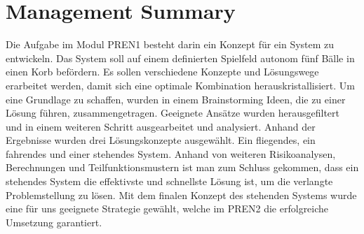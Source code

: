 \section*{Management Summary}
Die Aufgabe im Modul PREN1 besteht darin ein Konzept für ein System zu 
entwickeln. Das System soll auf einem definierten Spielfeld autonom 
fünf Bälle in einen Korb befördern. Es sollen verschiedene Konzepte und 
Lösungswege erarbeitet werden, damit sich eine optimale Kombination herauskristallisiert. 
Um eine Grundlage zu schaffen, wurden in einem Brainstorming Ideen, die zu 
einer Lösung führen, zusammengetragen. Geeignete Ansätze wurden herausgefiltert 
und in einem weiteren Schritt ausgearbeitet und analysiert. Anhand der 
Ergebnisse wurden drei Lösungskonzepte ausgewählt. Ein fliegendes, 
ein fahrendes und einer stehendes System. Anhand von weiteren Risikoanalysen, 
Berechnungen und Teilfunktionsmustern ist man zum Schluss gekommen, dass ein 
stehendes System die effektivste und schnellste Lösung ist, um die verlangte 
Problemstellung zu lösen. Mit dem finalen Konzept des stehenden Systems wurde 
eine für uns geeignete Strategie gewählt, welche im PREN2 die erfolgreiche 
Umsetzung garantiert.
